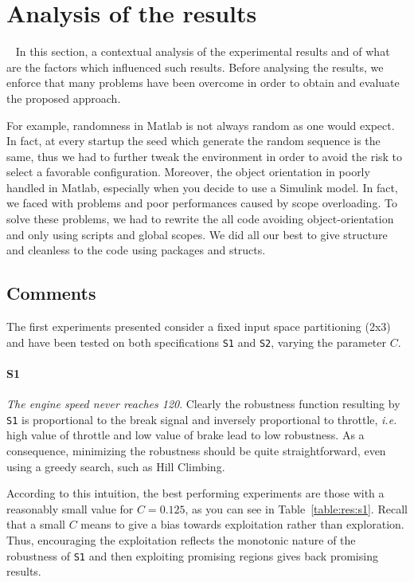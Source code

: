 \documentclass[11pt]{article}
\begin{document}
\pagebreak

\section{Analysis of the results}~\label{sec:resan}
In this section, a contextual analysis of the experimental results and of what are the factors which influenced such results.
Before analysing the results, we enforce that many problems have been overcome in order to obtain and evaluate the proposed approach. 

For example, randomness in Matlab is not always random as one would expect. In fact, at every startup the seed which generate the random sequence is the same, thus we had to further tweak the environment in order to avoid the risk to select a favorable configuration. Moreover, the object orientation in poorly handled in Matlab, especially when you decide to use a Simulink model. In fact, we faced with problems and poor performances caused by scope overloading. To solve these
problems, we had to rewrite the all code avoiding object-orientation and only using scripts and global scopes. We did all our best to give structure and cleanless to the code using packages and structs. 

\subsection{Comments}
The first experiments presented consider a fixed input space partitioning (2x3) and have been tested on both specifications \texttt{S1} and \texttt{S2}, varying the parameter $C$.

\paragraph{S1} \textit{The engine speed never reaches 120}. Clearly the robustness function resulting by \texttt{S1} is proportional to the break signal and inversely proportional to throttle, \textit{i.e.} high value of throttle and low value of brake lead to low robustness.
As a consequence, minimizing the robustness should be quite straightforward, even using a greedy search, such as Hill Climbing.

According to this intuition, the best performing experiments are those with a reasonably small value for $C=0.125$, as you can see in Table~\ref{table:res:s1}.
Recall that a small $C$ means to give a bias towards exploitation rather than exploration. Thus, encouraging the exploitation reflects the monotonic nature of the robustness of \texttt{S1} and then exploiting promising regions gives back promising results.
\end{document}
